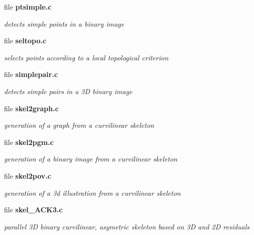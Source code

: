 \begin{CompactItemize}
\item 
file {\bf ptsimple.c}
\begin{CompactList}\small\item\em detects simple points in a binary image \item\end{CompactList}

\item 
file {\bf seltopo.c}
\begin{CompactList}\small\item\em selects points according to a local topological criterion \item\end{CompactList}

\item 
file {\bf simplepair.c}
\begin{CompactList}\small\item\em detects simple pairs in a 3D binary image \item\end{CompactList}

\item 
file {\bf skel2graph.c}
\begin{CompactList}\small\item\em generation of a graph from a curvilinear skeleton \item\end{CompactList}

\item 
file {\bf skel2pgm.c}
\begin{CompactList}\small\item\em generation of a binary image from a curvilinear skeleton \item\end{CompactList}

\item 
file {\bf skel2pov.c}
\begin{CompactList}\small\item\em generation of a 3d illustration from a curvilinear skeleton \item\end{CompactList}

\item 
file {\bf skel\_\-ACK3.c}
\begin{CompactList}\small\item\em parallel 3D binary curvilinear, asymetric skeleton based on 3D and 2D residuals \item\end{CompactList}


\end{CompactItemize}
